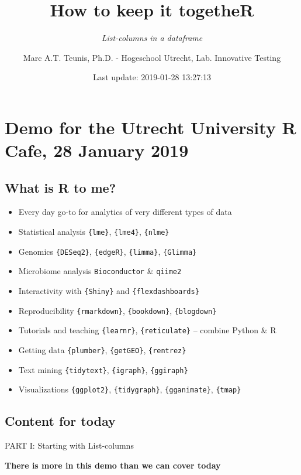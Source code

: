 \documentclass[]{article}
\title{How to keep it togetheR}
\subtitle{\emph{List-columns in a dataframe}}
\author{Marc A.T. Teunis, Ph.D. - Hogeschool Utrecht, Lab. Innovative Testing}
\date{Last update: 2019-01-28 13:27:13}
\providecommand{\tightlist}{%
  \setlength{\itemsep}{0pt}\setlength{\parskip}{0pt}}
\begin{document}
\maketitle

\section{Demo for the Utrecht University R Cafe, 28 January
2019}\label{demo-for-the-utrecht-university-r-cafe-28-january-2019}

\subsection{What is R to me?}\label{what-is-r-to-me}

\begin{itemize}
\tightlist
\item
  Every day go-to for analytics of very different types of data
\item
  Statistical analysis \texttt{\{lme\}}, \texttt{\{lme4\}},
  \texttt{\{nlme\}}
\item
  Genomics \texttt{\{DESeq2\}}, \texttt{\{edgeR\}}, \texttt{\{limma\}},
  \texttt{\{Glimma\}}
\item
  Microbiome analysis \texttt{Bioconductor} \& \texttt{qiime2}
\item
  Interactivity with \texttt{\{Shiny\}} and \texttt{\{flexdashboards\}}
\item
  Reproducibility \texttt{\{rmarkdown\}}, \texttt{\{bookdown\}},
  \texttt{\{blogdown\}}
\item
  Tutorials and teaching \texttt{\{learnr\}}, \texttt{\{reticulate\}} --
  combine Python \& R
\item
  Getting data \texttt{\{plumber\}}, \texttt{\{getGEO\}},
  \texttt{\{rentrez\}}
\item
  Text mining \texttt{\{tidytext\}}, \texttt{\{igraph\}},
  \texttt{\{ggiraph\}}
\item
  Visualizations \texttt{\{ggplot2\}}, \texttt{\{tidygraph\}},
  \texttt{\{gganimate\}}, \texttt{\{tmap\}}
\end{itemize}

\subsection{Content for today}\label{content-for-today}

PART I: Starting with List-columns

\textbf{There is more in this demo than we can cover today}
\end{document}
